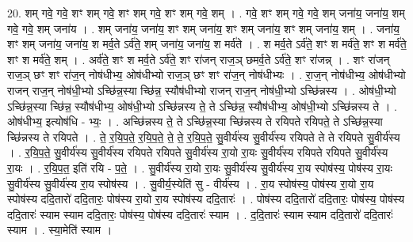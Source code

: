 \documentclass[17pt]{extarticle}
\begin{document}
20. शम् गवे॒ गवे॒ शꣳ शम् गवे॒ शꣳ शम् गवे॒ शꣳ शम् गवे॒ शम् । . गवे॒ शꣳ शम् गवे॒ गवे॒ शम् जना॑य॒ जना॑य॒ शम् गवे॒ गवे॒ शम् जना॑य । . शम् जना॑य॒ जना॑य॒ शꣳ शम् जना॑य॒ शꣳ शम् जना॑य॒ शꣳ शम् जना॑य॒ शम् । . जना॑य॒ शꣳ शम् जना॑य॒ जना॑य॒ श मर्व॒ते ऽर्व॑ते॒ शम् जना॑य॒ जना॑य॒ श मर्व॑ते । . श मर्व॒ते ऽर्व॑ते॒ शꣳ श मर्व॑ते॒ शꣳ श मर्व॑ते॒ शꣳ श मर्व॑ते॒ शम् । . अर्व॑ते॒ शꣳ श मर्व॒ते ऽर्व॑ते॒ शꣳ रा॑जन् राज॒ञ् छमर्व॒ते ऽर्व॑ते॒ शꣳ रा॑जन्न् । . शꣳ रा॑जन् राज॒ञ् छꣳ शꣳ रा॑ज॒न् नोष॑धीभ्य॒ ओष॑धीभ्यो राज॒ञ् छꣳ शꣳ रा॑ज॒न् नोष॑धीभ्यः । . रा॒ज॒न् नोष॑धीभ्य॒ ओष॑धीभ्यो राजन् राज॒न् नोष॑धी॒भ्यो ऽच्छि॑न्न॒स्या च्छि॑न्न॒ स्यौष॑धीभ्यो राजन् राज॒न् नोष॑धी॒भ्यो ऽच्छि॑न्नस्य । . ओष॑धी॒भ्यो ऽच्छि॑न्न॒स्या च्छि॑न्न॒ स्यौष॑धीभ्य॒ ओष॑धी॒भ्यो ऽच्छि॑न्नस्य ते॒ ते ऽच्छि॑न्न॒ स्यौष॑धीभ्य॒ ओष॑धी॒भ्यो ऽच्छि॑न्नस्य ते । . ओष॑धीभ्य॒ इत्योष॑धि - भ्यः॒ । . अच्छि॑न्नस्य ते॒ ते ऽच्छि॑न्न॒स्या च्छि॑न्नस्य ते रयिपते रयिपते॒ ते ऽच्छि॑न्न॒स्या च्छि॑न्नस्य ते रयिपते । . ते॒ र॒यि॒प॒ते॒ र॒यि॒प॒ते॒ ते॒ ते॒ र॒यि॒प॒ते॒ सु॒वीर्य॑स्य सु॒वीर्य॑स्य रयिपते ते ते रयिपते सु॒वीर्य॑स्य । . र॒यि॒प॒ते॒ सु॒वीर्य॑स्य सु॒वीर्य॑स्य रयिपते रयिपते सु॒वीर्य॑स्य रा॒यो रा॒यः सु॒वीर्य॑स्य रयिपते रयिपते सु॒वीर्य॑स्य रा॒यः । . र॒यि॒प॒त॒ इति॑ रयि - प॒ते॒ । . सु॒वीर्य॑स्य रा॒यो रा॒यः सु॒वीर्य॑स्य सु॒वीर्य॑स्य रा॒य स्पोष॑स्य॒ पोष॑स्य रा॒यः सु॒वीर्य॑स्य सु॒वीर्य॑स्य रा॒य स्पोष॑स्य । . सु॒वीर्य॒स्येति॑ सु - वीर्य॑स्य । . रा॒य स्पोष॑स्य॒ पोष॑स्य रा॒यो रा॒य स्पोष॑स्य ददि॒तारो॑ ददि॒तारः॒ पोष॑स्य रा॒यो रा॒य स्पोष॑स्य ददि॒तारः॑ । . पोष॑स्य ददि॒तारो॑ ददि॒तारः॒ पोष॑स्य॒ पोष॑स्य ददि॒तारः॑ स्याम स्याम ददि॒तारः॒ पोष॑स्य॒ पोष॑स्य ददि॒तारः॑ स्याम । . द॒दि॒तारः॑ स्याम स्याम ददि॒तारो॑ ददि॒तारः॑ स्याम । . स्या॒मेति॑ स्याम । \newline
\end{document}
